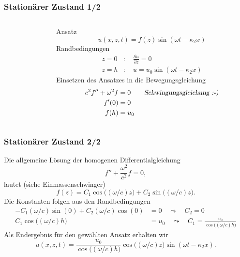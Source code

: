 \begin{frame}
\frametitle{Stationärer Zustand 1/2}
\begin{columns}
\begin{column}[t]{.1\linewidth}

\end{column}
\begin{column}[b]{.9\linewidth}
Ansatz
\begin{equation*}
u(x,z,t) = f(z) \sin(\omega t - \kappa_2 x) 
\end{equation*}
Randbedingungen
\begin{align*}
z=0 &:\quad \frac{\partial u}{\partial z}=0\\
z=h &:\quad u=u_0 \sin(\omega t - \kappa_2 x)
\end{align*}
Einsetzen des Ansatzes in die Bewegungsgleichung
\begin{align*}
 c^2 f''+\omega^2 f &=0 \qquad \text{\textsl{Schwingungsgleichung :-)}}\\
 f'(0) &=0\\
 f(h) &= u_0
\end{align*}
\end{column}
\end{columns}
\end{frame}

\begin{frame}
\frametitle{Stationärer Zustand 2/2}
Die allgemeine Lösung der homogenen Differentialgleichung
\begin{equation*}
 f''+\frac{\omega^2}{c^2}f=0,
\end{equation*}
lautet (siehe Einmassenschwinger)
\begin{equation*}
 f(z)=C_1\cos\bigl((\omega/c)z\bigr)+C_2\sin\bigl((\omega/c)z\bigr).
\end{equation*}
Die Konstanten folgen aus den Randbedingungen
\begin{align*}
-C_1(\omega/c)\sin(0)+C_2(\omega/c)\cos(0)&=0 \quad \leadsto \quad C_2=0\\
 C_1\cos\bigl((\omega/c)h\bigr)&=u_0
 \quad \leadsto \quad C_1=\frac{u_0}{\cos\bigl((\omega/c)h\bigr)}
\end{align*}
Als Endergebnis für den gewählten Ansatz erhalten wir
\begin{equation*}
 u(x,z,t)=\frac{u_0}{\cos\bigl((\omega/c)h\bigr)}\cos\bigl((\omega/c)z\bigr)\sin(\omega t - \kappa_2 x) .
\end{equation*}
\end{frame}

